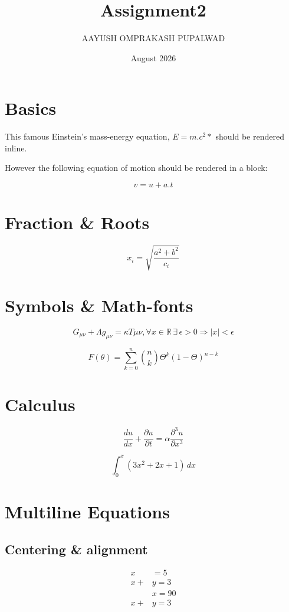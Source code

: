 \documentclass [12pt,a4paper]{article}
\title{Assignment2}
\author{AAYUSH OMPRAKASH PUPALWAD}
\date{August 2026}
\begin{document}
\maketitle

\section{Basics}

This famous Einstein’s mass-energy equation, $E = m.c^2*$ should be rendered inline.

However the following equation of motion should be rendered in a block:

\[
v=u+a.t
\]

\section{Fraction \& Roots}

\[
x_i = \sqrt{\frac{a^2+b^2}{c_i}}
\]

\section{Symbols \& Math-fonts}

\[
G_{\mu\nu} + \Lambda g_{\mu\nu} = \kappa T{\mu\nu},
\forall x \in \mathbb{R}\, \exists\, \epsilon >0 
\Rightarrow{|x| < \epsilon}
\]

\[
F(\theta)=
\sum_{k=0}^{n}
\binom{n}{k} 
\Theta^{k}
(1-\Theta)^{n-k}
\]

\section{Calculus}

\[
\frac{du}{dx} + \frac{\partial u}{\partial t}
= \alpha \frac{\partial^3 u}{\partial x^3}
\]

\[
\int_0^x (3x^2+2x+1)\,dx 
\]

\section{Multiline Equations}

\subsection{Centering \& alignment}

\begin{align}
 x&=5 \tag{1} \\
x+&y=3\tag{2}\\
&x=90\tag{3}\\
x+&y=3\tag{4}
\end{align}
\end{document}
